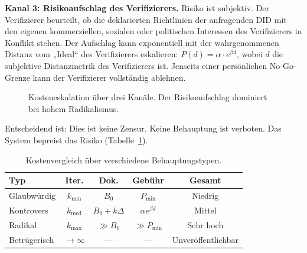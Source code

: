 \documentclass[11pt,a4paper,twocolumn]{article}
\begin{document}
\textbf{Kanal 3: Risikoaufschlag des Verifizierers.} Risiko ist subjektiv. Der Verifizierer beurteilt, ob die deklarierten Richtlinien der anfragenden DID mit den eigenen kommerziellen, sozialen oder politischen Interessen des Verifizierers in Konflikt stehen. Der Aufschlag kann exponentiell mit der wahrgenommenen Distanz vom „Ideal“ des Verifizierers eskalieren: $P(d) = \alpha \cdot e^{\beta d}$, wobei $d$ die subjektive Distanzmetrik des Verifizierers ist. Jenseits einer persönlichen No-Go-Grenze kann der Verifizierer vollständig ablehnen.

\begin{figure}[ht]
\centering
{}
\caption{Kosteneskalation über drei Kanäle. Der Risikoaufschlag dominiert bei hohem Radikalismus.}
\label{fig:radicalism}
\end{figure}

Entscheidend ist: Dies ist keine Zensur. Keine Behauptung ist verboten. Das System bepreist das Risiko (Tabelle~\ref{tab:costs}).

\begin{table}[ht]
\centering
\caption{Kostenvergleich über verschiedene Behauptungstypen.}
\label{tab:costs}
\footnotesize
\begin{tabular}{@{}lcccc@{}}
\toprule
\textbf{Typ} & \textbf{Iter.} & \textbf{Dok.} & \textbf{Gebühr} & \textbf{Gesamt} \\
\midrule
Glaubwürdig & $k_{\min}$ & $B_0$ & $P_{\min}$ & Niedrig \\
Kontrovers & $k_{\text{med}}$ & $B_0{+}k\Delta$ & $\alpha e^{\beta d}$ & Mittel \\
Radikal & $k_{\max}$ & $\gg B_0$ & $\gg P_{\min}$ & Sehr hoch \\
Betrügerisch & $\to\infty$ & --- & --- & Unveröffentlichbar \\
\bottomrule
\end{tabular}
\end{table}
\end{document}
